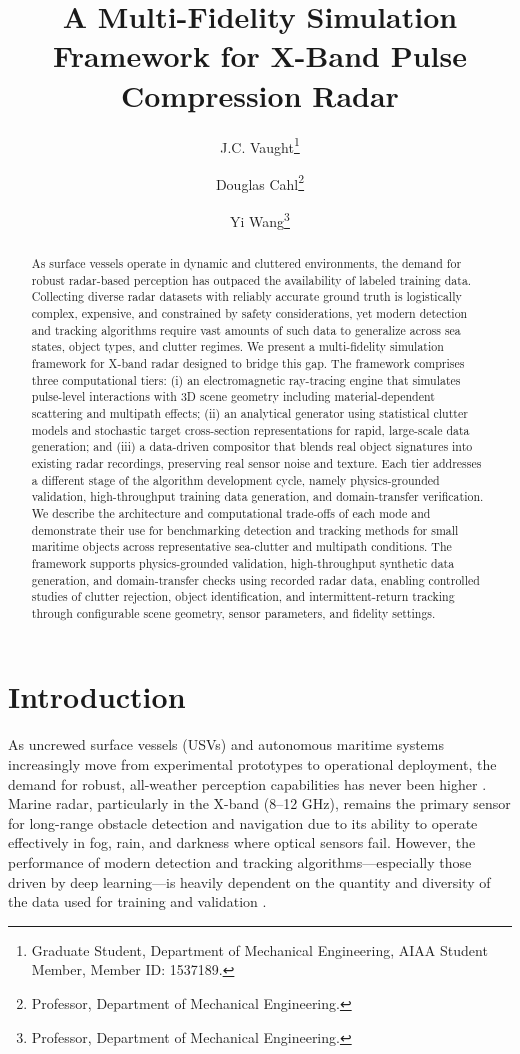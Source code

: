 \documentclass[conf]{new-aiaa}
\title{A Multi-Fidelity Simulation Framework for X-Band Pulse Compression Radar}
\author{J.C. Vaught\footnote{Graduate Student, Department of Mechanical Engineering, AIAA Student Member, Member ID: 1537189.}}
\author{Douglas Cahl\footnote{Professor, Department of Mechanical Engineering.}}
\author{Yi Wang\footnote{Professor, Department of Mechanical Engineering.}}
\affil{Department of Mechanical Engineering, University of South Carolina, Columbia, SC, 29208}
\begin{document}
\maketitle

\begin{abstract}
As surface vessels operate in dynamic and cluttered environments, the demand for robust radar-based perception has outpaced the availability of labeled training data. Collecting diverse radar datasets with reliably accurate ground truth is logistically complex, expensive, and constrained by safety considerations, yet modern detection and tracking algorithms require vast amounts of such data to generalize across sea states, object types, and clutter regimes. We present a multi-fidelity simulation framework for X-band radar designed to bridge this gap. The framework comprises three computational tiers: (i) an electromagnetic ray-tracing engine that simulates pulse-level interactions with 3D scene geometry including material-dependent scattering and multipath effects; (ii) an analytical generator using statistical clutter models and stochastic target cross-section representations for rapid, large-scale data generation; and (iii) a data-driven compositor that blends real object signatures into existing radar recordings, preserving real sensor noise and texture. Each tier addresses a different stage of the algorithm development cycle, namely physics-grounded validation, high-throughput training data generation, and domain-transfer verification. We describe the architecture and computational trade-offs of each mode and demonstrate their use for benchmarking detection and tracking methods for small maritime objects across representative sea-clutter and multipath conditions. The framework supports physics-grounded validation, high-throughput synthetic data generation, and domain-transfer checks using recorded radar data, enabling controlled studies of clutter rejection, object identification, and intermittent-return tracking through configurable scene geometry, sensor parameters, and fidelity settings.
\end{abstract}

\section{Introduction}
As uncrewed surface vessels (USVs) and autonomous maritime systems increasingly move from experimental prototypes to operational deployment, the demand for robust, all-weather perception capabilities has never been higher \cite{liu2016unmanned}. Marine radar, particularly in the X-band (8--12 GHz), remains the primary sensor for long-range obstacle detection and navigation due to its ability to operate effectively in fog, rain, and darkness where optical sensors fail. However, the performance of modern detection and tracking algorithms—especially those driven by deep learning—is heavily dependent on the quantity and diversity of the data used for training and validation \cite{lecun2015deep}.
\end{document}
